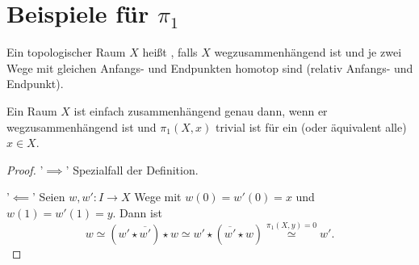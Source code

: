\section{Beispiele für $\pi_1$}

\begin{definition}
    Ein topologischer Raum $X$ heißt  , falls $X$ wegzusammenhängend ist und je zwei Wege mit gleichen Anfangs- und Endpunkten homotop sind (relativ Anfangs- und Endpunkt).

\begin{minipage}{\textwidth}
    \centering
\end{minipage}
\end{definition}

\begin{lemma}
    Ein Raum $X$ ist einfach zusammenhängend genau dann, wenn er wegzusammenhängend ist und  $\pi_1(X,x)$ trivial ist für ein (oder äquivalent alle) $x\in X$.
\end{lemma}

\begin{proof}
'$\implies$' Spezialfall der Definition.    

'$\impliedby$' Seien $w, w'\colon I \to X$ Wege mit $w(0) = w'(0) =x$ und  $w(1) = w'(1) = y$. Dann ist 
 \[
     w \simeq (w' \star  \overline{w'}) \star w \simeq w' \star (\overline{w'} \star w) \stackrel{\pi_1(X,y) = 0}{\simeq} w'
.\] 
\end{proof}

